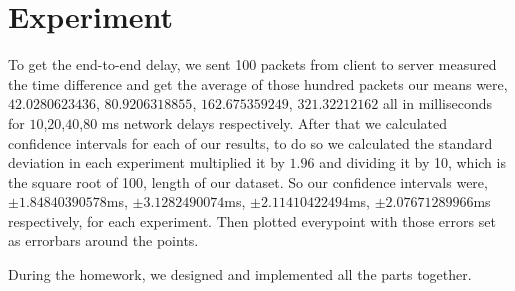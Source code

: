 \documentclass[12pt]{article}
\begin{document}
\section*{Experiment}
To get the end-to-end delay, we sent 100 packets from client to server
measured the time difference and get the average of those hundred packets
our means were, $42.0280623436$, $80.9206318855$, $162.675359249$, $321.32212162$
all in milliseconds for $10$,$20$,$40$,$80$ ms network delays respectively. After
that we calculated confidence intervals for each of our results, to do so
we calculated the standard deviation in each experiment multiplied it by $1.96$
and dividing it by 10, which is the square root of 100, length of our dataset.
So our confidence intervals were, $\pm 1.84840390578$ms, $\pm 3.1282490074$ms, 
$\pm 2.11410422494$ms, $\pm 2.07671289966$ms respectively, for each experiment.
Then plotted everypoint with those errors set as errorbars around the points.

During the homework, we designed and implemented all the parts together.
\end{document}
